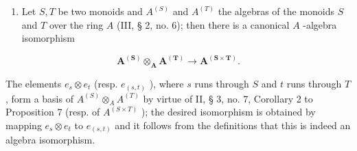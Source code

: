 \begin{enumerate}
\def\labelenumi{(\arabic{enumi})}
\setcounter{enumi}{1}
\tightlist
\item
  Let \(S, T\) be two monoids and \(A^{(S)}\) and \(A^{(T)}\) the algebras of the monoids \(S\) and \(T\) over the ring \(A\) (III, § 2, no. 6); then there is a canonical \(A\) -algebra isomorphism
\end{enumerate}

\[
\mathbf {A} ^ {(\mathbf {S})} \otimes_ {\mathbf {A}} \mathbf {A} ^ {(\mathbf {T})} \rightarrow \mathbf {A} ^ {(\mathbf {S} \times \mathbf {T})}.\tag{3}
\]

The elements \(e_s \otimes e_t\) (resp. \(e_{(s,t)}\) ), where \(s\) runs through \(S\) and \(t\) runs through \(T\) , form a basis of \(A^{(S)} \otimes_A A^{(T)}\) by virtue of II, § 3, no. 7, Corollary 2 to Proposition 7 (resp. of \(A^{(S \times T)}\) ); the desired isomorphism is obtained by mapping \(e_s \otimes e_t\) to \(e_{(s,t)}\) and it follows from the definitions that this is indeed an algebra isomorphism.

